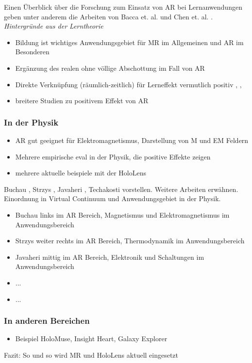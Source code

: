 Einen Überblick über die Forschung zum Einsatz von AR bei Lernanwendungen geben unter anderem die Arbeiten von Bacca et. al. und Chen et. al. \cite{Chen2017, Bacca14}.\\

\vspace{4px}
\textit{Hintergründe aus der Lerntheorie}\\

\begin{itemize}
	\item Bildung ist wichtiges Anwendungsgebiet für MR im Allgemeinen und AR im Besonderen
	\item Ergänzung des realen ohne völlige Abschottung im Fall von AR
	\item Direkte Verknüpfung (räumlich-zeitlich) für Lerneffekt vermutlich positiv \cite{Akcayir17}, \cite{Chen2017}, \cite{Knierim18}
	\item breitere Studien zu positivem Effekt von AR
\end{itemize}

\subsubsection{In der Physik}
\begin{itemize}
	\item AR gut geeignet für Elektromagnetismus, Darstellung von M und EM Feldern
	\item Mehrere empirische eval in der Physik, die positive Effekte zeigen
	\item mehrere aktuelle beispiele mit der HoloLens
\end{itemize}
Buchau \cite{Buchau09}, Strzys \cite{Strzys18}, Javaheri \cite{Javaheri18}, Techakosti \cite{Techakosit15} vorstellen. Weitere Arbeiten erwähnen.\\
Einordnung in Virtual Continuum und Anwendungsgebiet in der Physik.
\begin{itemize}
	\item Buchau links im AR Bereich, Magnetismus und Elektromagnetismus im Anwendungsbereich
	\item Strzys weiter rechts im AR Bereich, Thermodynamik im Anwendungsbereich
	\item Javaheri mittig im AR Bereich, Elektronik und Schaltungen im Anwendungsbereich
	\item ...
	\item ...
\end{itemize}

\subsubsection{In anderen Bereichen}
\begin{itemize}
	\item Beispiel HoloMuse, Insight Heart, Galaxy Explorer 
\end{itemize}

Fazit: So und so wird MR und HoloLens aktuell eingesetzt


